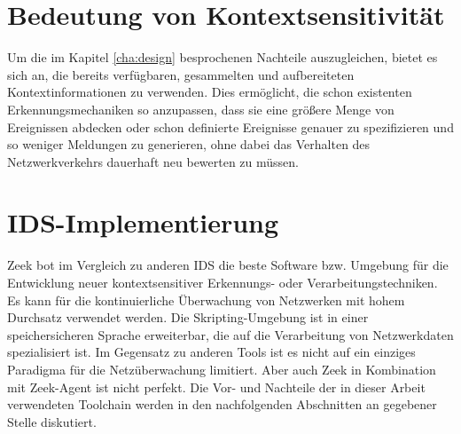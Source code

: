 \section{Bedeutung von Kontextsensitivität}
Um die im Kapitel \ref{cha:design} besprochenen Nachteile auszugleichen, bietet es sich an, die bereits verfügbaren, gesammelten und aufbereiteten Kontextinformationen zu verwenden. Dies ermöglicht, die schon existenten Erkennungsmechaniken so anzupassen, dass sie eine größere Menge von Ereignissen abdecken oder schon definierte Ereignisse genauer zu spezifizieren und so weniger Meldungen zu generieren, ohne dabei das Verhalten des Netzwerkverkehrs dauerhaft neu bewerten zu müssen.
\section{IDS-Implementierung}
Zeek bot im Vergleich zu anderen IDS die beste Software bzw. Umgebung für die Entwicklung neuer kontextsensitiver Erkennungs- oder Verarbeitungstechniken. Es kann für die kontinuierliche Überwachung von Netzwerken mit hohem Durchsatz verwendet werden. Die Skripting-Umgebung ist in einer speichersicheren Sprache erweiterbar, die auf die Verarbeitung von Netzwerkdaten spezialisiert ist. Im Gegensatz zu anderen Tools ist es nicht auf ein einziges Paradigma für die Netzüberwachung limitiert.
Aber auch Zeek in Kombination mit Zeek-Agent ist nicht perfekt. Die Vor- und Nachteile der in dieser Arbeit verwendeten Toolchain werden in den nachfolgenden Abschnitten an gegebener Stelle diskutiert.
